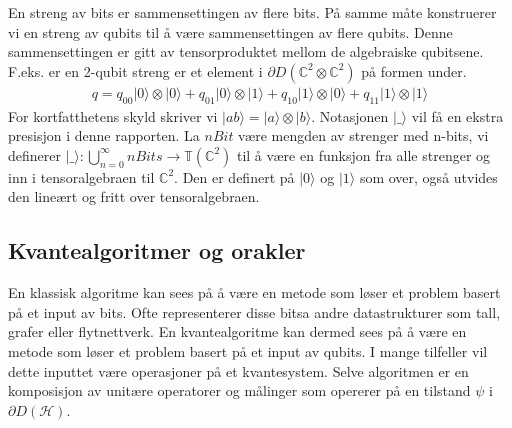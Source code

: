         En streng av bits er sammensettingen av flere bits. På samme måte konstruerer vi en streng av qubits til å være sammensettingen av flere qubits. Denne sammensettingen er gitt av tensorproduktet mellom de algebraiske qubitsene. F.eks. er en 2-qubit streng er et element i $\partial D(\mathbb{C}^2\otimes\mathbb{C}^2)$ på formen under.
        \begin{align*}
            q = q_{00}|0\rangle\otimes |0\rangle + q_{01}|0\rangle\otimes |1\rangle + q_{10}|1\rangle\otimes|0\rangle + q_{11}|1\rangle\otimes |1\rangle
        \end{align*}
        For kortfatthetens skyld skriver vi $|ab\rangle = |a\rangle\otimes |b\rangle$. Notasjonen $|\_\rangle$ vil få en ekstra presisjon i denne rapporten. La $nBit$ være mengden av strenger med n-bits, vi definerer $|\_\rangle : \bigcup_{n=0}^{\infty}nBits \rightarrow \mathbb{T}(\mathbb{C}^2)$ til å være en funksjon fra alle strenger og inn i tensoralgebraen til $\mathbb{C}^2$. Den er definert på $|0\rangle$ og $|1\rangle$ som over, også utvides den lineært og fritt over tensoralgebraen. 


\subsection{Kvantealgoritmer og orakler}

        En klassisk algoritme kan sees på å være en metode som løser et problem basert på et input av bits. Ofte representerer disse bitsa andre datastrukturer som tall, grafer eller flytnettverk. En kvantealgoritme kan dermed sees på å være en metode som løser et problem basert på et input av qubits. I mange tilfeller vil dette inputtet være operasjoner på et kvantesystem. Selve algoritmen er en komposisjon av unitære operatorer og målinger som opererer på en tilstand $\psi$ i $\partial D(\mathcal{H})$. 
        
